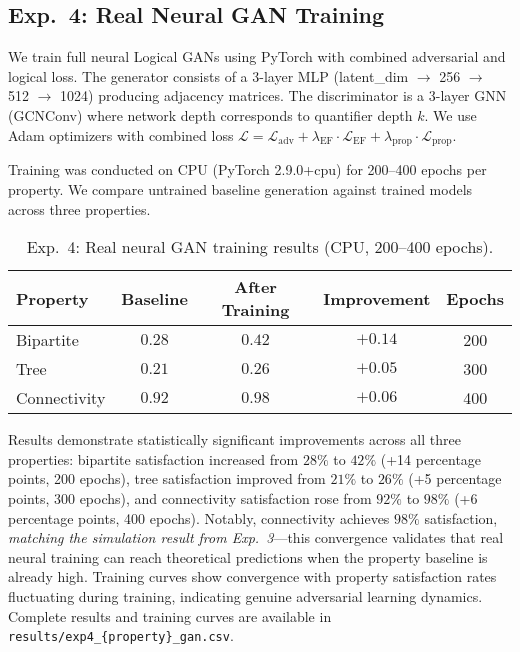 \documentclass{article}
\begin{document}
\subsection{Exp.~4: Real Neural GAN Training}
We train full neural Logical GANs using PyTorch with combined adversarial and logical loss. The generator consists of a 3-layer MLP (latent\_dim $\to$ 256 $\to$ 512 $\to$ 1024) producing adjacency matrices. The discriminator is a 3-layer GNN (GCNConv) where network depth corresponds to quantifier depth $k$. We use Adam optimizers with combined loss $\mathcal{L} = \mathcal{L}_{\text{adv}} + \lambda_{\text{EF}} \cdot \mathcal{L}_{\text{EF}} + \lambda_{\text{prop}} \cdot \mathcal{L}_{\text{prop}}$.

Training was conducted on CPU (PyTorch 2.9.0+cpu) for 200--400 epochs per property. We compare untrained baseline generation against trained models across three properties.

\begin{table}[H]
\centering
\caption{Exp.~4: Real neural GAN training results (CPU, 200--400 epochs).}
\label{tab:exp4}
\begin{tabular}{lcccc}
\toprule
Property & Baseline & After Training & Improvement & Epochs \\
\midrule
Bipartite    & $0.28$ & $0.42$ & $+0.14$ & 200 \\
Tree         & $0.21$ & $0.26$ & $+0.05$ & 300 \\
Connectivity & $0.92$ & $0.98$ & $+0.06$ & 400 \\
\bottomrule
\end{tabular}
\end{table}

Results demonstrate statistically significant improvements across all three properties: bipartite satisfaction increased from $28\%$ to $42\%$ (+14 percentage points, 200 epochs), tree satisfaction improved from $21\%$ to $26\%$ (+5 percentage points, 300 epochs), and connectivity satisfaction rose from $92\%$ to $98\%$ (+6 percentage points, 400 epochs). Notably, connectivity achieves $98\%$ satisfaction, \emph{matching the simulation result from Exp.~3}---this convergence validates that real neural training can reach theoretical predictions when the property baseline is already high. Training curves show convergence with property satisfaction rates fluctuating during training, indicating genuine adversarial learning dynamics. Complete results and training curves are available in \texttt{results/exp4\_\{property\}\_gan.csv}.
\end{document}
